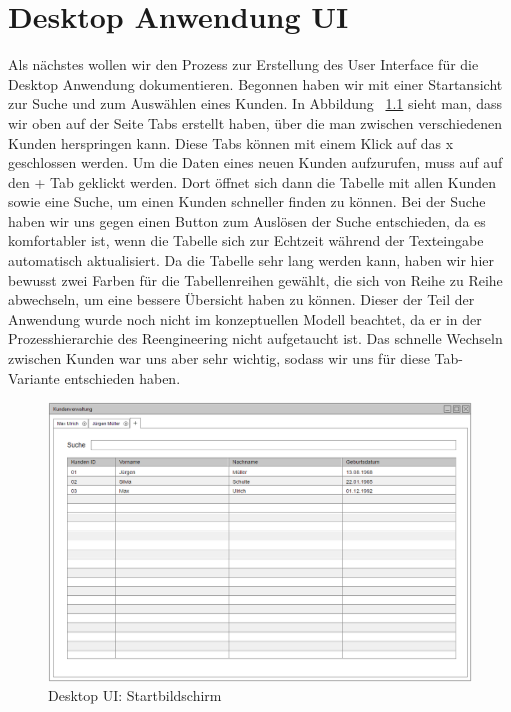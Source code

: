 \chapter{Desktop Anwendung UI}

Als nächstes wollen wir den Prozess zur Erstellung des User Interface für die Desktop Anwendung dokumentieren. Begonnen haben wir mit einer Startansicht zur Suche und zum Auswählen eines Kunden. In Abbildung ~\ref{desktopUI:1} sieht man, dass wir oben auf der Seite Tabs erstellt haben, über die man zwischen verschiedenen Kunden herspringen kann. Diese Tabs können mit einem Klick auf das x geschlossen werden. Um die Daten eines neuen Kunden aufzurufen, muss auf auf den + Tab geklickt werden. Dort öffnet sich dann die Tabelle mit allen Kunden sowie eine Suche, um einen Kunden schneller finden zu können. Bei der Suche haben wir uns gegen einen Button zum Auslösen der Suche entschieden, da es komfortabler ist, wenn die Tabelle sich zur Echtzeit während der Texteingabe automatisch aktualisiert. Da die Tabelle sehr lang werden kann, haben wir hier bewusst zwei Farben für die Tabellenreihen gewählt, die sich von Reihe zu Reihe abwechseln, um eine bessere Übersicht haben zu können. Dieser der Teil der Anwendung wurde noch nicht im konzeptuellen Modell beachtet, da er in der Prozesshierarchie des Reengineering nicht aufgetaucht ist. Das schnelle Wechseln zwischen Kunden war uns aber sehr wichtig, sodass wir uns für diese Tab-Variante entschieden haben.

\begin{figure}[ht!]
\centering
\includegraphics[width=\linewidth]{1Startbildschirm}
\caption{Desktop UI: Startbildschirm}
\label{desktopUI:1}
\end{figure}

